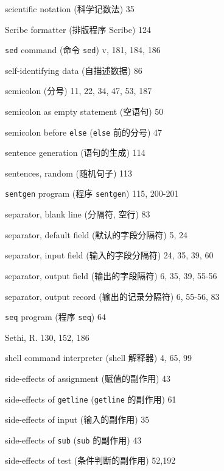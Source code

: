 \begin{multicols}{2}
\hangindent=2pc  scientific notation (科学记数法) 35

\hangindent=2pc  Scribe formatter (排版程序 Scribe) 124

\hangindent=2pc  \verb'sed' command (命令 \verb'sed')
v, 181, 184, 186

\hangindent=2pc  self-identifying data (自描述数据) 86

\hangindent=2pc  semicolon (分号) 11, 22, 34, 47, 53, 187

\hangindent=2pc  semicolon as empty statement (空语句) 50

\hangindent=2pc  semicolon before \verb'else' (\verb'else'
前的分号) 47

\hangindent=2pc  sentence generation (语句的生成) 114

\hangindent=2pc  sentences, random (随机句子) 113

\hangindent=2pc  \verb'sentgen' program (程序 \verb'sentgen')
115, 200-201

\hangindent=2pc  separator, blank line (分隔符, 空行) 83

\hangindent=2pc  separator, default field (默认的字段分隔符) 5, 24

\hangindent=2pc  separator, input field (输入的字段分隔符)
24, 35, 39, 60

\hangindent=2pc  separator, output field (输出的字段隔符)
6, 35, 39, 55-56

\hangindent=2pc  separator, output record (输出的记录分隔符)
6, 55-56,  83

\hangindent=2pc  \verb'seq' program (程序 \verb'seq') 64

\hangindent=2pc  Sethi, R. 130, 152, 186

\hangindent=2pc  shell command interpreter (shell 解释器) 4, 65, 99

\hangindent=2pc  side-effects of assignment (赋值的副作用) 43

\hangindent=2pc  side-effects of \verb'getline' (\verb'getline'
的副作用) 61

\hangindent=2pc  side-effects of input (输入的副作用) 35

\hangindent=2pc  side-effects of \verb'sub' (\verb'sub'
的副作用) 43

\hangindent=2pc  side-effects of test (条件判断的副作用) 52,192


\end{multicols}
